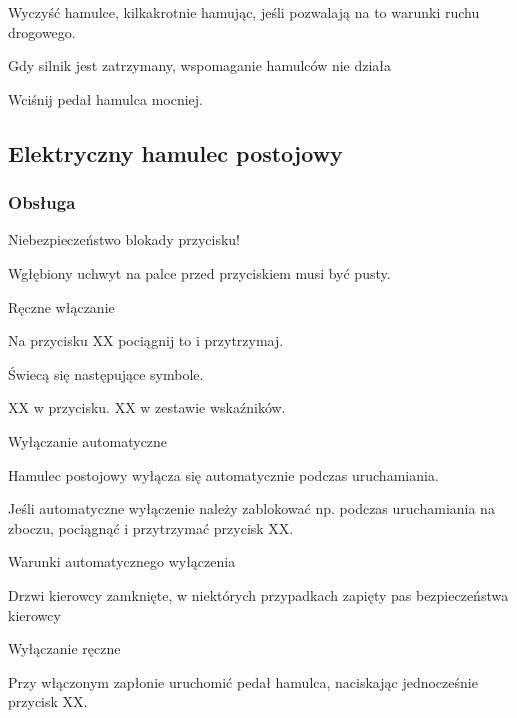 \begin{itemizeArrow}
	\itemArrow Wyczyść hamulce, kilkakrotnie hamując, jeśli pozwalają na to warunki ruchu drogowego.
\end{itemizeArrow}
Gdy silnik jest zatrzymany, wspomaganie hamulców nie działa
\begin{itemizeArrow}
	\itemArrow Wciśnij pedał hamulca mocniej.
\end{itemizeArrow}

\subsection{Elektryczny hamulec postojowy}

\subsubsection{Obsługa}

Niebezpieczeństwo blokady przycisku!
\begin{itemizeTriangle}
	\itemTriangle Wgłębiony uchwyt na palce przed przyciskiem musi być pusty.
\end{itemizeTriangle}

Ręczne włączanie
\begin{itemizeArrow}
	\itemArrow Na przycisku XX pociągnij to i przytrzymaj.
\end{itemizeArrow}
Świecą się następujące symbole.
\begin{itemizeTriangle}
	\itemTriangle XX w przycisku.
	\itemTriangle XX w zestawie wskaźników.
\end{itemizeTriangle}

Wyłączanie automatyczne

Hamulec postojowy wyłącza się automatycznie podczas uruchamiania.

Jeśli automatyczne wyłączenie należy zablokować np. podczas uruchamiania na zboczu, pociągnąć i przytrzymać przycisk XX.

Warunki automatycznego wyłączenia

\begin{itemizeTick}
	\itemTick Drzwi kierowcy zamknięte, w niektórych przypadkach zapięty pas bezpieczeństwa kierowcy
\end{itemizeTick}

Wyłączanie ręczne

\begin{itemizeArrow}
	\itemArrow Przy włączonym zapłonie uruchomić pedał hamulca, naciskając jednocześnie przycisk XX.
\end{itemizeArrow}

